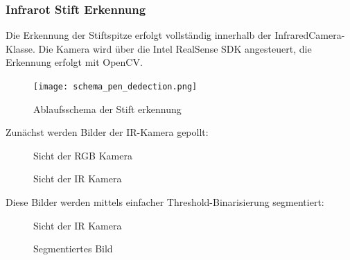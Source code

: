 \clearpage
\subsubsection{Infrarot Stift Erkennung}

Die Erkennung der Stiftspitze erfolgt vollständig innerhalb der InfraredCamera-Klasse. Die Kamera wird über die Intel RealSense SDK angesteuert, die Erkennung erfolgt mit OpenCV.

\begin{figure}[H]
    \centering
    \texttt{[image: schema\_pen\_dedection.png]}
    \caption{Ablaufsschema der Stift erkennung}
    \label{fig:enter-label}
\end{figure}

Zunächst werden Bilder der IR-Kamera gepollt:

\begin{figure}[H]
    \begin{minipage}{0.48\textwidth}
    \centering
    \caption{Sicht der RGB Kamera}
    \label{Fig:Data1}
  \end{minipage}
  \hfill
  \begin{minipage}{0.48\textwidth}
    \centering
    \caption{Sicht der IR Kamera}
    \label{Fig:Data2}
  \end{minipage}
\end{figure}

Diese Bilder werden mittels einfacher Threshold-Binarisierung segmentiert:

\begin{figure}[H]
    \begin{minipage}{0.48\textwidth}
    \centering
    \caption{Sicht der IR Kamera}
    \label{Fig:Data1}
  \end{minipage}
  \hfill
  \begin{minipage}{0.48\textwidth}
    \centering
    \caption{Segmentiertes Bild}
    \label{Fig:binarisiert}
  \end{minipage}
\end{figure}

